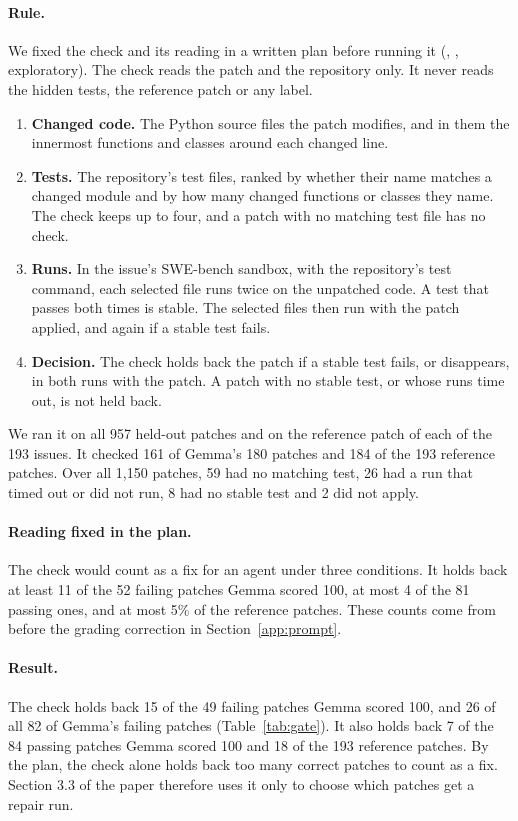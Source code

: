 \documentclass[10pt,letterpaper]{article}
\begin{document}
\paragraph{Rule.} We fixed the check and its reading in a written plan before running it
(, , exploratory). The check reads the patch and
the repository only. It never reads the hidden tests, the reference patch or any label.
\begin{enumerate}
\item \textbf{Changed code.} The Python source files the patch modifies, and in them the innermost functions and
classes around each changed line.
\item \textbf{Tests.} The repository's test files, ranked by whether their name matches a changed module and by how
many changed functions or classes they name. The check keeps up to four, and a patch with no matching test file
has no check.
\item \textbf{Runs.} In the issue's SWE-bench sandbox, with the repository's test command, each selected file runs
twice on the unpatched code. A test that passes both times is stable. The selected files then run with the patch
applied, and again if a stable test fails.
\item \textbf{Decision.} The check holds back the patch if a stable test fails, or disappears, in both runs with the
patch. A patch with no stable test, or whose runs time out, is not held back.
\end{enumerate}
We ran it on all 957 held-out patches and on the reference patch of each of the 193 issues. It checked 161 of Gemma's
180 patches and 184 of the 193 reference patches. Over all 1,150 patches, 59 had no matching test, 26 had a run that
timed out or did not run, 8 had no stable test and 2 did not apply.

\paragraph{Reading fixed in the plan.} The check would count as a fix for an agent under three conditions. It holds back at
least 11 of the 52 failing patches Gemma scored 100, at most 4 of the 81 passing ones, and at most 5\% of the reference
patches. These counts come from before the grading correction in Section~\ref{app:prompt}.

\paragraph{Result.} The check holds back 15 of the 49 failing patches Gemma scored 100, and 26 of all 82 of Gemma's
failing patches (Table~\ref{tab:gate}). It also holds back 7 of the 84 passing patches Gemma scored 100 and 18 of the
193 reference patches. By the plan, the check alone holds back too many correct patches to count as a fix. Section 3.3
of the paper therefore uses it only to choose which patches get a repair run.
\end{document}
